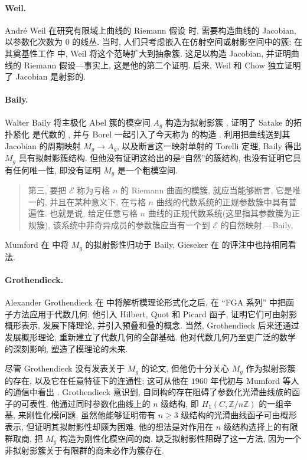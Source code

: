 \paragraph*{Weil.} André Weil 在研究有限域上曲线的 Riemann 假设 \cite{Wei48} 时, 需要构造曲线的 Jacobian, 以参数化次数为 $0$ 的线丛. 当时, 人们只考虑嵌入在仿射空间或射影空间中的簇; 在其奠基性工作 \cite{Wei62} 中, Weil 将这个范畴扩大到抽象簇. 这足以构造 Jacobian, 并证明曲线的 Riemann 假设---事实上, 这是他的第二个证明. 后来, Weil 和 Chow 独立证明了 Jacobian 是射影的.

\paragraph*{Baily.} Walter Baily 将主极化 Abel 簇的模空间 $A_g$ 构造为拟射影簇 \cite{Bai60a,Bai60b}, 证明了 Satake 的拓扑紧化 \cite{Sat56} 是代数的 \cite{Bai58}, 并与 Borel 一起引入了今天称为  的构造 \cite{BB66}. 利用把曲线送到其 Jacobian 的周期映射 $M_g\to A_g$, 以及断言这一映射单射的 Torelli 定理, Baily 得出 $M_g$ 具有拟射影簇结构. 但他没有证明这给出的是``自然''的簇结构, 也没有证明它具有任何唯一性, 即没有证明 $M_g$ 是一个粗模空间.
\begin{quote}
第三, 要把 $\mathcal E$ 称为亏格 $n$ 的 Riemann 曲面的模簇, 就应当能够断言, 它是唯一的, 并且在某种意义下, 在亏格 $n$ 曲线的代数系统的正规参数簇中具有普遍性. 也就是说, 给定任意亏格 $n$ 曲线的正规代数系统(这里指其参数簇为正规簇), 该系统中非奇异成员的参数簇应当有一个到 $\mathcal E$ 的自然映射.\hfill---Baily, \cite[第 $59$--$60$ 页]{Bai60b}
\end{quote}
Mumford 在 \cite[第 $98$ 页]{Mum75a} 中将 $M_g$ 的拟射影性归功于 Baily, Gieseker 在 \cite{Mum04} 的评注中也持相同看法.

\paragraph*{Grothendieck.} Alexander Grothendieck 在 \cite{Gro61} 中将解析模理论形式化之后, 在 ``FGA 系列'' \cite{FGAI,FGAIII,FGAIV,FGAV,FGAVI} 中把函子方法应用于代数几何: 他引入 Hilbert, Quot 和 Picard 函子, 证明它们可由射影概形表示, 发展下降理论, 并引入预叠和叠的概念. 当然, Grothendieck 后来还通过发展概形理论, 重新建立了代数几何的全部基础. 他对代数几何乃至更广泛的数学的深刻影响, 塑造了模理论的未来.

尽管 Grothendieck 没有发表关于 $M_g$ 的论文, 但他仍十分关心 $M_g$ 作为拟射影簇的存在, 以及它在任意特征下的连通性; 这可从他在 $1960$ 年代初与 Mumford 等人的通信中看出 \cite[\S II]{Mum10}. Grothendieck 意识到, 自同构的存在阻碍了参数化光滑曲线族的函子的可表性. 他通过同时参数化曲线上的 $n$ 级结构, 即 $H_1(C,\mathbb Z/n\mathbb Z)$ 的一组辛基, 来刚性化模问题. 虽然他能够证明带有 $n\geq3$ 级结构的光滑曲线函子可由概形表示, 但证明其拟射影性却颇为困难. 他的想法是对作用在 $n$ 级结构选择上的有限群取商, 把 $M_g$ 构造为刚性化模空间的商. 缺乏拟射影性阻碍了这一方法, 因为一个非拟射影簇关于有限群的商未必作为簇存在.

